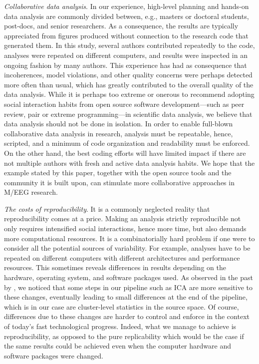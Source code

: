 \emph{Collaborative data analysis}. In our experience, high-level planning and hands-on data analysis are commonly divided between, e.g., masters or doctoral students, post-docs, and senior researchers. As a consequence, the results are typically appreciated from figures produced without connection to the research code that generated them. In this study, several authors contributed repeatedly to the code, analyses were repeated on different computers, and results were inspected in an ongoing fashion by many authors. This experience has had as consequence that incoherences, model violations, and other quality concerns were perhaps detected more often than usual, which has greatly contributed to the overall quality of the data analysis. While it is perhaps too extreme or onerous to recommend adopting social interaction habits from open source software development---such as peer review, pair or extreme programming---in scientific data analysis, we believe that data analysis should not be done in isolation. In order to enable full-blown collaborative data analysis in research, analysis must be repeatable, hence, scripted, and a minimum of code organization and readability must be enforced. On the other hand, the best coding efforts will have limited impact if there are not multiple authors with fresh and active data analysis habits. We hope that the example stated by this paper, together with the open source tools and the community it is built upon, can stimulate more collaborative approaches in M/EEG research.

\emph{The costs of reproducibility}. It is a commonly neglected reality that reproducibility comes at a price. Making an analysis strictly reproducible not only requires intensified social interactions, hence more time, but also demands more computational resources. It is a combinatorially hard problem if one were to consider all the potential sources of variability. For example, analyses have to be repeated on different computers with different architectures and performance resources. This sometimes reveals differences in results depending on the hardware, operating system, and software packages used. As observed in the past by \cite{glatard-etal:15}, we noticed that some steps in our pipeline such as ICA are more sensitive to these changes, eventually leading to small differences at the end of the pipeline, which is in our case are cluster-level statistics in the source space. Of course, differences due to these changes are harder to control and enforce in the context of today's fast technological progress. Indeed, what we manage to achieve is reproducibility, as opposed to the pure replicability which would be the case if the same results could be achieved even when the computer hardware and software packages were changed.


